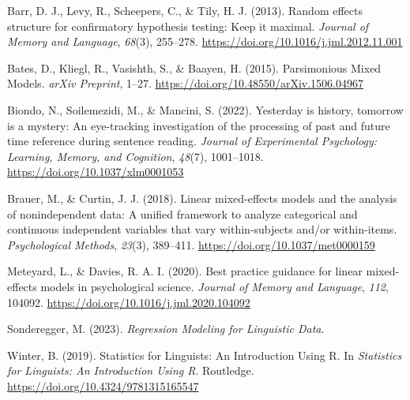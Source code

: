 \documentclass[
  letterpaper,
  DIV=11,
  numbers=noendperiod]{scrartcl}
\newlength{\cslhangindent}
\newlength{\cslentryspacingunit} %
\newenvironment{CSLReferences}[2] %
 {%
  \setlength{\parindent}{0pt}
  \ifodd #1
  \let\oldpar\par
  \def\par{\hangindent=\cslhangindent\oldpar}
  \fi
  \setlength{\parskip}{#2\cslentryspacingunit}
 }%
 {}
\begin{document}
\hypertarget{refs}{}
\begin{CSLReferences}{1}{0}
\leavevmode{}%
Barr, D. J., Levy, R., Scheepers, C., \& Tily, H. J. (2013). Random
effects structure for confirmatory hypothesis testing: {Keep} it
maximal. \emph{Journal of Memory and Language}, \emph{68}(3), 255--278.
\url{https://doi.org/10.1016/j.jml.2012.11.001}

\leavevmode{}%
Bates, D., Kliegl, R., Vasishth, S., \& Baayen, H. (2015). Parsimonious
{Mixed Models}. \emph{arXiv Preprint}, 1--27.
\url{https://doi.org/10.48550/arXiv.1506.04967}

\leavevmode{}%
Biondo, N., Soilemezidi, M., \& Mancini, S. (2022). Yesterday is
history, tomorrow is a mystery: {An} eye-tracking investigation of the
processing of past and future time reference during sentence reading.
\emph{Journal of Experimental Psychology: Learning, Memory, and
Cognition}, \emph{48}(7), 1001--1018.
\url{https://doi.org/10.1037/xlm0001053}

\leavevmode{}%
Brauer, M., \& Curtin, J. J. (2018). Linear mixed-effects models and the
analysis of nonindependent data: {A} unified framework to analyze
categorical and continuous independent variables that vary
within-subjects and/or within-items. \emph{Psychological Methods},
\emph{23}(3), 389--411. \url{https://doi.org/10.1037/met0000159}

\leavevmode{}%
Meteyard, L., \& Davies, R. A. I. (2020). Best practice guidance for
linear mixed-effects models in psychological science. \emph{Journal of
Memory and Language}, \emph{112}, 104092.
\url{https://doi.org/10.1016/j.jml.2020.104092}

\leavevmode{}%
Sonderegger, M. (2023). \emph{Regression {Modeling} for {Linguistic
Data}}.

\leavevmode{}%
Winter, B. (2019). Statistics for {Linguists}: {An Introduction Using
R}. In \emph{Statistics for Linguists: An Introduction Using R}.
{Routledge}. \url{https://doi.org/10.4324/9781315165547}

\end{CSLReferences}
\end{document}

